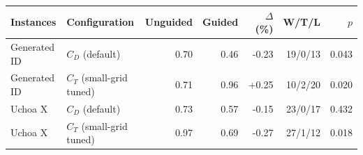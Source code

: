 \begin{tabular}{llrrrrr}
\toprule
Instances & Configuration & Unguided & Guided & $\Delta$ (\%) & W/T/L & $p$ \\
\midrule
Generated ID & $C_D$ (default) & 0.70 & 0.46 & -0.23 & 19/0/13 & 0.043 \\
Generated ID & $C_T$ (small-grid tuned) & 0.71 & 0.96 & +0.25 & 10/2/20 & 0.020 \\
Uchoa X & $C_D$ (default) & 0.73 & 0.57 & -0.15 & 23/0/17 & 0.432 \\
Uchoa X & $C_T$ (small-grid tuned) & 0.97 & 0.69 & -0.27 & 27/1/12 & 0.018 \\
\bottomrule
\end{tabular}
